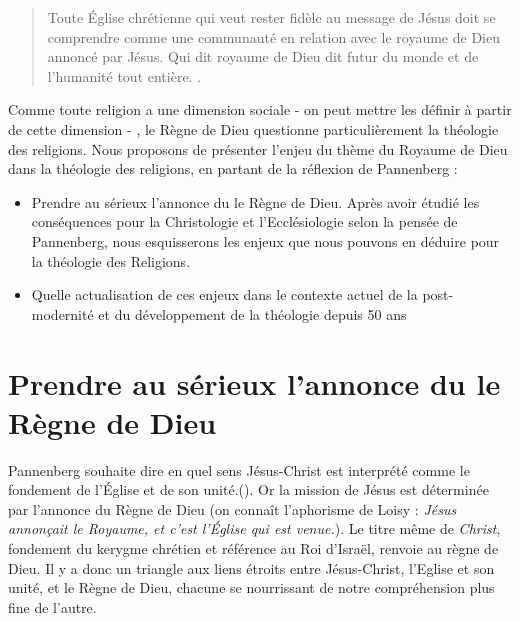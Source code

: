 \begin{quote}
    Toute Église chrétienne qui veut rester fidèle au message de Jésus doit se comprendre comme une communauté en relation avec le royaume de Dieu annoncé par Jésus. Qui dit royaume de Dieu dit futur du monde et de l’humanité tout entière.  \cite[pp. 74]{Pannenberg:RoyaumeDieu}. 
\end{quote}



Comme toute religion a une dimension sociale - on peut mettre les définir à partir de cette dimension 
  - , le Règne de Dieu questionne particulièrement la théologie des religions. Nous proposons de présenter l’enjeu du thème du Royaume de Dieu dans la théologie des religions, en partant de la réflexion de Pannenberg : 

\begin{itemize}
    \item Prendre au sérieux l'annonce du le Règne de Dieu. Après avoir étudié les conséquences pour la Christologie et l'Ecclésiologie selon la pensée de Pannenberg, nous esquisserons les enjeux que nous pouvons en déduire pour la théologie des Religions.
    \item Quelle actualisation de ces enjeux dans le contexte actuel de la post-modernité et du développement de la théologie depuis 50 ans
\end{itemize}



\section{Prendre au sérieux l'annonce du le Règne de Dieu}

Pannenberg souhaite dire en quel sens Jésus-Christ est interprété comme le fondement de l’Église et de son unité.(\cite[p. 82]{Pannenberg:RoyaumeDieu}). Or la mission de Jésus est déterminée par l'annonce du Règne de Dieu (on connaît l'aphorisme de Loisy : \textit{Jésus annonçait le Royaume, et c'est l'Église qui est venue.}). Le titre même de \textit{Christ}, fondement du kerygme chrétien et référence au Roi d'Israël, renvoie au règne de Dieu. 
Il y a donc un triangle  aux liens étroits entre Jésus-Christ, l'Eglise et son unité, et le Règne de Dieu, chacune se nourrissant de notre compréhension plus fine de l'autre.
 
